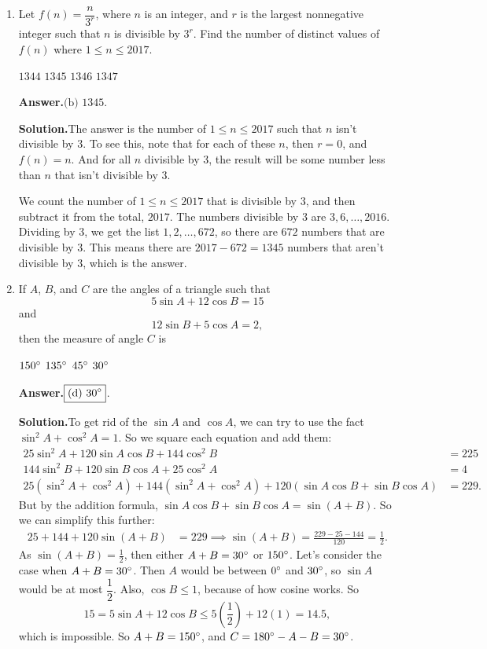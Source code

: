 \documentclass[11pt,paper=letter]{scrartcl}
\newcommand{\ans}{{\sffamily \bfseries Answer.}\;}
\newcommand{\ansb}[2]{\ans\(\boxed{\text{(#1) #2}}\).}
\newcommand{\sol}{{\sffamily \bfseries Solution.}\;}
\begin{document}
\begin{enumerate}[left=0pt]
\item Let $f(n) = \dfrac{n}{3^r}$, where $n$ is an integer, and $r$ is the largest nonnegative integer such that $n$ is divisible by $3^r$. Find the number of distinct values of $f(n)$ where $1 \le n \le 2017$.

\fourch
{$1344$}
{$1345$}
{$1346$}
{$1347$}

\ansb{b}{$1345$}

\sol The answer is the number of $1 \le n \le 2017$ such that $n$ isn't divisible by $3$. To see this, note that for each of these $n$, then $r = 0$, and $f(n) = n$. And for all $n$ divisible by $3$, the result will be some number less than $n$ that isn't divisible by $3$.

We count the number of $1 \le n \le 2017$ that is divisible by $3$, and then subtract it from the total, $2017$. The numbers divisible by $3$ are $3, 6, \ldots, 2016$. Dividing by $3$, we get the list $1, 2, \ldots, 672$, so there are $672$ numbers that are divisible by $3$. This means there are $2017 - 672 = 1345$ numbers that aren't divisible by $3$, which is the answer.

\item If $A$, $B$, and $C$ are the angles of a triangle such that \[
  5 \sin A + 12 \cos B = 15
\]
and \[
  12 \sin B + 5 \cos A = 2,
\]
then the measure of angle $C$ is

\fourch
{$150^\circ$}
{$135^\circ$}
{$45^\circ$}
{$30\dg$}

\ansb{d}{$30\dg$}

\sol To get rid of the $\sin A$ and $\cos A$, we can try to use the fact $\sin^2 A + \cos^2 A = 1$. So we square each equation and add them:
\begin{align*}
25 \sin^2 A + 120 \sin A \cos B + 144 \cos^2B &= 225 \\
144 \sin^2 B + 120 \sin B \cos A + 25 \cos^2 A &= 4 \\
25\left(\sin^2 A + \cos^2 A\right) + 144\left(\sin^2 A + \cos^2 A\right) + 120\left(\sin A \cos B + \sin B \cos A\right) &= 229.
\end{align*}
But by the addition formula, $\sin A \cos B + \sin B \cos A = \sin(A + B)$. So we can simplify this further:
\begin{align*}
25 + 144 + 120\sin(A + B) &= 229 \implies \sin(A + B) = \frac{229 - 25 - 144}{120} = \frac{1}{2}.
\end{align*}
As $\sin(A + B) = \frac{1}{2}$, then either $A + B = 30^\circ$ or $150^\circ$. Let's consider the case when $A + B = 30^\circ$. Then $A$ would be between $0^\circ$ and $30\dg$, so $\sin A$ would be at most $\dfrac{1}{2}$. Also, $\cos B \le 1$, because of how cosine works. So \[
  15 = 5 \sin A + 12 \cos B \le 5\left(\frac{1}{2}\right) + 12(1) = 14.5,
\]
which is impossible. So $A + B = 150^\circ$, and $C = 180^\circ - A - B = 30^\circ$.

\end{enumerate}
\end{document}
